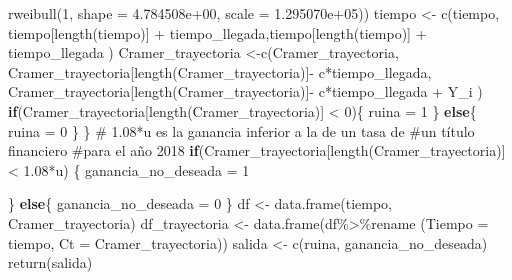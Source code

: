 \documentclass[
  us-letterpaper,
]{scrreprt}
\newenvironment{Shaded}{\begin{snugshade}}{\end{snugshade}}
\newcommand{\AttributeTok}[1]{\textcolor[rgb]{0.40,0.45,0.13}{#1}}
\newcommand{\CommentTok}[1]{\textcolor[rgb]{0.37,0.37,0.37}{#1}}
\newcommand{\ControlFlowTok}[1]{\textcolor[rgb]{0.00,0.23,0.31}{\textbf{#1}}}
\newcommand{\DecValTok}[1]{\textcolor[rgb]{0.68,0.00,0.00}{#1}}
\newcommand{\FloatTok}[1]{\textcolor[rgb]{0.68,0.00,0.00}{#1}}
\newcommand{\FunctionTok}[1]{\textcolor[rgb]{0.28,0.35,0.67}{#1}}
\newcommand{\NormalTok}[1]{\textcolor[rgb]{0.00,0.23,0.31}{#1}}
\newcommand{\OtherTok}[1]{\textcolor[rgb]{0.00,0.23,0.31}{#1}}
\newcommand{\SpecialCharTok}[1]{\textcolor[rgb]{0.37,0.37,0.37}{#1}}
\theoremstyle{plain}
\theoremstyle{plain}
\theoremstyle{definition}
\theoremstyle{remark}
\begin{document}
\begin{Shaded}
\begin{Highlighting}[]
             \FunctionTok{rweibull}\NormalTok{(}\DecValTok{1}\NormalTok{,  }\AttributeTok{shape =} \FloatTok{4.784508e+00}\NormalTok{, }\AttributeTok{scale =} \FloatTok{1.295070e+05}\NormalTok{)) }
\NormalTok{    tiempo }\OtherTok{\textless{}{-}} \FunctionTok{c}\NormalTok{(tiempo, tiempo[}\FunctionTok{length}\NormalTok{(tiempo)] }\SpecialCharTok{+}
\NormalTok{                  tiempo\_llegada,tiempo[}\FunctionTok{length}\NormalTok{(tiempo)] }\SpecialCharTok{+} 
\NormalTok{                  tiempo\_llegada ) }
\NormalTok{    Cramer\_trayectoria }\OtherTok{\textless{}{-}}\FunctionTok{c}\NormalTok{(Cramer\_trayectoria,}
\NormalTok{                Cramer\_trayectoria[}\FunctionTok{length}\NormalTok{(Cramer\_trayectoria)]}\SpecialCharTok{{-}}
\NormalTok{                  c}\SpecialCharTok{*}\NormalTok{tiempo\_llegada,}
\NormalTok{                Cramer\_trayectoria[}\FunctionTok{length}\NormalTok{(Cramer\_trayectoria)]}\SpecialCharTok{{-}}
\NormalTok{                  c}\SpecialCharTok{*}\NormalTok{tiempo\_llegada }\SpecialCharTok{+}\NormalTok{  Y\_i )}
    \ControlFlowTok{if}\NormalTok{(Cramer\_trayectoria[}\FunctionTok{length}\NormalTok{(Cramer\_trayectoria)] }\SpecialCharTok{\textless{}} \DecValTok{0}\NormalTok{)\{}
\NormalTok{      ruina }\OtherTok{=} \DecValTok{1}
\NormalTok{    \}}
    \ControlFlowTok{else}\NormalTok{\{}
\NormalTok{      ruina }\OtherTok{=} \DecValTok{0}
\NormalTok{    \}}
\NormalTok{  \}}
\CommentTok{\# 1.08*u es la ganancia inferior a la de un tasa de }
  \CommentTok{\#un título financiero }
\CommentTok{\#para el año 2018}
  \ControlFlowTok{if}\NormalTok{(Cramer\_trayectoria[}\FunctionTok{length}\NormalTok{(Cramer\_trayectoria)] }\SpecialCharTok{\textless{}} \FloatTok{1.08}\SpecialCharTok{*}\NormalTok{u) \{}
\NormalTok{    ganancia\_no\_deseada }\OtherTok{=} \DecValTok{1}
    
\NormalTok{  \} }
  \ControlFlowTok{else}\NormalTok{\{}
\NormalTok{    ganancia\_no\_deseada }\OtherTok{=} \DecValTok{0}
\NormalTok{  \}}
\NormalTok{  df }\OtherTok{\textless{}{-}} \FunctionTok{data.frame}\NormalTok{(tiempo, Cramer\_trayectoria)}
\NormalTok{  df\_trayectoria }\OtherTok{\textless{}{-}} \FunctionTok{data.frame}\NormalTok{(df}\SpecialCharTok{\%\textgreater{}\%}\NormalTok{rename}
\NormalTok{                               (}\AttributeTok{Tiempo =}\NormalTok{ tiempo, }
                                \AttributeTok{Ct =}\NormalTok{ Cramer\_trayectoria))}
\NormalTok{  salida }\OtherTok{\textless{}{-}} \FunctionTok{c}\NormalTok{(ruina, ganancia\_no\_deseada)}
  \FunctionTok{return}\NormalTok{(salida)}
  

\end{Highlighting}
\end{Shaded}
\end{document}
